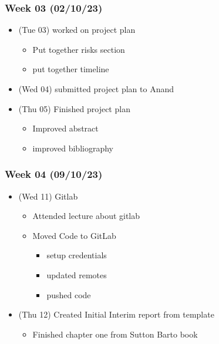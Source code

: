 \hypertarget{week-03-021023}{%
\subsubsection{Week 03 (02/10/23)}\label{week-03-021023}}

\begin{itemize}
\tightlist
\item
  (Tue 03) worked on project plan

  \begin{itemize}
  \tightlist
  \item
    Put together risks section
  \item
    put together timeline
  \end{itemize}
\item
  (Wed 04) submitted project plan to Anand
\item
  (Thu 05) Finished project plan

  \begin{itemize}
  \tightlist
  \item
    Improved abstract
  \item
    improved bibliography
  \end{itemize}
\end{itemize}

\hypertarget{week-04-091023}{%
\subsubsection{Week 04 (09/10/23)}\label{week-04-091023}}

\begin{itemize}
\tightlist
\item
  (Wed 11) Gitlab

  \begin{itemize}
  \tightlist
  \item
    Attended lecture about gitlab
  \item
    Moved Code to GitLab

    \begin{itemize}
    \tightlist
    \item
      setup credentials
    \item
      updated remotes
    \item
      pushed code
    \end{itemize}
  \end{itemize}
\item
  (Thu 12) Created Initial Interim report from template

  \begin{itemize}
  \tightlist
  \item
    Finished chapter one from Sutton Barto book
  \end{itemize}
\end{itemize}

